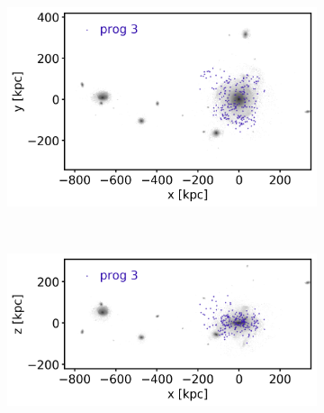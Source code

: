 \begin{figure}[htbp]
    \begin{subfigure}[c]{0.48\textwidth}
    \centering
    	\includegraphics[width=\textwidth]{plots/Dynamics/dist/xy_dist_selected_GCs_prog_3_snap_127.png}
    	\label{fig:prog3_xy}
    \end{subfigure}
    ~ %
    \begin{subfigure}[c]{0.48\textwidth}
        \centering
    	\includegraphics[width=\textwidth]{plots/Dynamics/dist/xz_dist_selected_GCs_prog_3_snap_127.png}
	    \label{fig:prog3_xz}
    \end{subfigure}
    

\end{figure}
